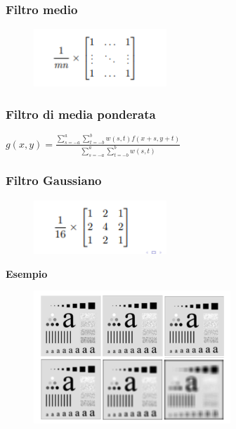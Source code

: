 \subsubsection{Filtro medio}

\begin{figure}[H]
    \centering
    \includegraphics[width=5cm, keepaspectratio]{capitoli/immagini/imgs/filtro-medio.png}
\end{figure}

\subsubsection{Filtro di media ponderata}

\begin{center}
    $g(x,y)=\frac{\sum_{s=-a}^{a}\sum_{t=-b}^{b}w(s,t)f(x+s,y+t)}{\sum_{s=-a}^{a}\sum_{t=-b}^{b}w(s,t)}$
\end{center}

\subsubsection{Filtro Gaussiano}

\begin{figure}[H]
    \centering
    \includegraphics[width=5cm, keepaspectratio]{capitoli/immagini/imgs/filtro-gaussiano.png}
\end{figure}
\textbf{Esempio}
\begin{figure}[H]
    \centering
    \includegraphics[width=\linewidth, keepaspectratio]{capitoli/immagini/imgs/filtri-l-esempio.png}
\end{figure}

